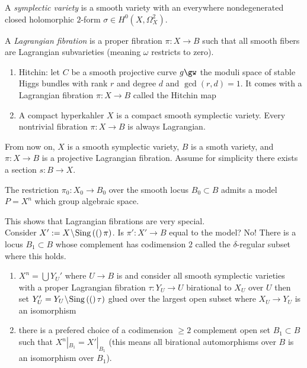 \documentclass[12pt]{article}
\begin{document}
\begin{defn}
A \textit{symplectic variety} is a smooth variety with an everywhere nondegenerated closed holomorphic $2$-form $\sigma \in H^0(X, \Omega_X^2)$.
\end{defn}

\begin{defn}
A \textit{Lagrangian fibration} is a proper fibration $\pi : X \to B$ such that all smooth fibers are Lagrangian subvarieties (meaning $\omega$ restricts to zero).
\end{defn}

\begin{example}
\begin{enumerate}
\item Hitchin: let $C$ be a smooth projective curve $g \gw$ the moduli space of stable Higgs bundles with rank $r$ and degree $d$ and $\gcd(r,d) = 1$. It comes with a Lagrangian fibration $\pi : X \to B$ called the Hitchin map
\item A compact hyperkahler $X$ is a compact smooth symplectic variety. Every nontrivial fibration $\pi : X \to B$ is always Lagrangian.
\end{enumerate}
\end{example}

From now on, $X$ is a smooth symplectic variety, $B$ is a smoth variety, and $\pi : X \to B$ is a projective Lagrangian fibration. Assume for simplicity there exists a section $s : B \to X$. 

\begin{theorem}
The restriction $\pi_0 : X_0 \to B_0$ over the smooth locus $B_0 \subset B$ admits a \Neron model $P = X^n$ which group algebraic space.
\end{theorem}

This shows that Lagrangian fibrations are very special. 
\\
Consider $X' := X \! \setminus \! \mathrm{Sing}\left( ( \right)\pi)$. Is $\pi' : X' \to B$ equal to the \Neron model? No! There is a locus $B_1 \subset B$ whose complement has codimension $2$ called the $\delta$-regular subset where this holds. 

\begin{theorem}
\begin{enumerate}
\item $X^n = \bigcup Y_U'$ where $U \to B$ is \etale and consider all smooth symplectic varieties with a proper Lagrangian fibration $\tau : Y_U \to U$ birational to $X_U$ over $U$ then set $Y'_U = Y_U \! \setminus \! \mathrm{Sing}\left( ( \right)\tau)$ glued over the largest open subset where $X_U \to Y_U$ is an isomorphism
\item there is a prefered choice of a codimension $\ge 2$ complement open set $B_1 \subset B$ such that $X^n|_{B_1} = X'|_{B_1}$ (this means all birational automorphisms over $B$ is an isomorphism over $B_1$). 
\end{enumerate}
\end{theorem}
\end{document}
